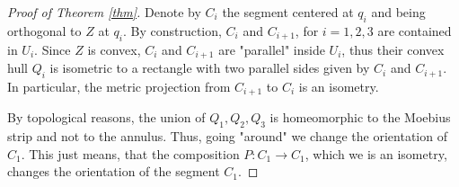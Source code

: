 \documentclass[12pt,leqno]{amsart}
\numberwithin{equation}{section}
\theoremstyle{remark}
\begin{document}
\begin{proof}[Proof of Theorem \ref{thm}]
 Denote by $C_i$ the segment centered at $q_i$ and being orthogonal to $Z$ at $q_i$.
By construction, $C_i$ and $C_{i+1}$, for $i=1,2,3$   are contained in $U_i$.  Since $Z$ is convex, $C_i$ and $C_{i+1}$ are "parallel" inside $U_i$, thus their convex hull  $Q_i$ is isometric to a rectangle with two parallel sides given by $C_i$ and $C_{i+1}$.  In particular, the metric projection from $C_{i+1}$ to $C_{i}$ is an isometry.   

By topological reasons, the union of $Q_1,Q_2,Q_3$ is homeomorphic to the Moebius strip and not to the annulus. Thus, going "around" we change the orientation of $C_1$. This just means, that the composition $P:C_1\to C_1$, which we is an isometry, changes the orientation of the segment $C_1$.	
	\end{proof}








\end{document}
